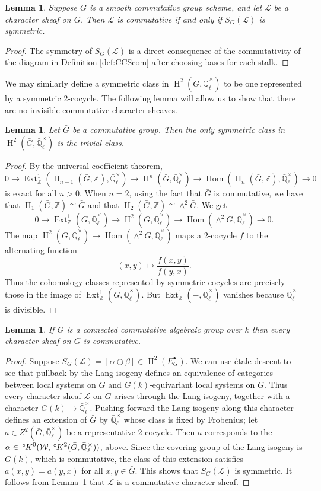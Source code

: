\documentclass[10pt]{amsart}
\theoremstyle{plain}
\newtheorem{lemma}[theorem]{Lemma}
\theoremstyle{definition}
\newcommand{\ZZ}{{\mathbb{Z}}}
\newcommand{\EE}{\mathbb{\bar Q}_\ell}
\newcommand{\Fq}{k}
\newcommand{\EEx}{\EE^\times}
\newcommand{\Weil}[1]{\mathcal{W}_{#1}}
\DeclareMathOperator{\Hom}{Hom}
\DeclareMathOperator{\Ext}{Ext}
\DeclareMathOperator{\Hh}{H}
\newcommand{\cs}[1]{{\mathcal{#1}}}
\newcommand{\bG}{\bar{G}}
\newcommand{\oK}{{\,^\circ \hskip-1pt K}}
\begin{document}
\begin{lemma} \label{lem:symccslink}
Suppose $G$ is a smooth commutative group scheme, and let $\cs{L}$ be a character sheaf on $G$.
Then $\cs{L}$ is commutative if and only if $S_G(\cs{L})$ is symmetric.
\end{lemma}
\begin{proof}
The symmetry of $S_G(\cs{L})$ is a direct consequence of the commutativity of the diagram in Definition \ref{def:CCScom}
after choosing bases for each stalk.
\end{proof}

We may similarly define a symmetric class in $\Hh^2(\bG, \EEx)$ to be one represented by a symmetric $2$-cocycle.
The following lemma will allow us to show that there are no invisible commutative character sheaves.

\begin{lemma} \label{lem:symtriv}
Let $\bG$ be a commutative group.  Then the only symmetric class in $\Hh^2(\bG, \EEx)$ is the trivial class.
\end{lemma}

\begin{proof}
By the universal coefficient theorem,
\[
0 \to \Ext^1_\ZZ(\Hh_{n-1}(\bG, \ZZ), \EEx) \to \Hh^n(\bG, \EEx) \to \Hom(\Hh_n(\bG, \ZZ), \EEx) \to 0
\]
is exact for all $n > 0$.  When $n = 2$, using the fact that $\bG$ is commutative, we have that $\Hh_1(\bG, \ZZ) \cong \bG$
and that $\Hh_2(\bG, \ZZ) \cong \wedge^2 \bG$. We get
\[
0 \to \Ext^1_\ZZ(\bG, \EEx) \to \Hh^2(\bG, \EEx) \to \Hom(\wedge^2 \bG, \EEx) \to 0.
\]
The map $\Hh^2(\bG, \EEx) \to \Hom(\wedge^2 \bG, \EEx)$ maps a $2$-cocycle $f$ to the alternating function
\[
(x,y) \mapsto \frac{f(x,y)}{f(y,x)}.
\]
Thus the cohomology classes represented by symmetric cocycles are precisely those in the image of $\Ext^1_\ZZ(\bG, \EEx)$.
But $\Ext^1_\ZZ(-, \EEx)$ vanishes because $\EEx$ is divisible.
\end{proof}

\begin{lemma} \label{lem:conncomm}
If $G$ is a connected commutative algebraic group over $\Fq$ then every character sheaf on $G$ is commutative.
\end{lemma}

\begin{proof}
Suppose $S_G(\cs{L}) = [\alpha\oplus \beta]\in \Hh^2(E_G^\bullet)$.
We can use \'etale descent to see that pullback by the Lang isogeny defines an equivalence
of categories between local systems on $G$ and $G(\Fq)$-equivariant local systems on $G$.  
Thus every character sheaf $\cs{L}$ on $G$ arises through the Lang isogeny, together with a character $G(\Fq) \to \EEx$.
Pushing forward the Lang isogeny along this character defines an extension of $\bG$ by $\EEx$ whose class is fixed by Frobenius; let $a\in Z^2(\bG, \EEx)$ be a representative $2$-cocycle.
Then $a$ corresponds to the $\alpha \in \oK^0(\Weil{}, \oK^2(\bG, \EEx))$, above. 
Since the covering group of the Lang isogeny is $G(k)$, which is commutative, the class of this extension satisfies $a(x,y) = a(y,x)$ for all $x,y \in \bG$. 
This shows that $S_{G}(\cs{L})$ is symmetric.
It follows from Lemma~\ref{lem:symccslink} that $\cs{L}$ is a commutative character sheaf.
\end{proof}
\end{document}
